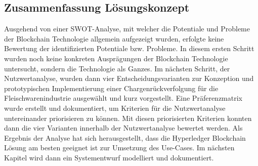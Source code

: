 \subsection{Zusammenfassung Lösungskonzept}
Ausgehend von einer SWOT-Analyse, mit welcher die Potentiale und Probleme der Blockchain Technologie allgemein aufgezeigt wurden, erfolgte keine Bewertung der identifizierten Potentiale bzw. Probleme. In diesem ersten Schritt wurden noch keine konkreten Ausprägungen der Blockchain Technologie untersucht, sondern die Technologie als Ganzes. Im nächsten Schritt, der Nutzwertanalyse, wurden dann vier Entscheidungsvarianten zur Konzeption und prototypischen Implementierung einer Chargenrückverfolgung für die Fleischwarenindustrie ausgewählt und kurz vorgestellt. Eine Präferenzmatrix wurde erstellt und dokumentiert, um Kriterien für die Nutzwertanalyse untereinander priorisieren zu können. Mit diesen priorisierten Kriterien konnten dann die vier Varianten innerhalb der Nutzwertanalyse bewertet werden. Als Ergebnis der Analyse hat sich herausgestellt, dass die Hyperledger Blockchain Lösung am besten geeignet ist zur Umsetzung des Use-Cases. Im nächsten Kapitel wird dann ein Systementwurf modelliert und dokumentiert.

\newpage

